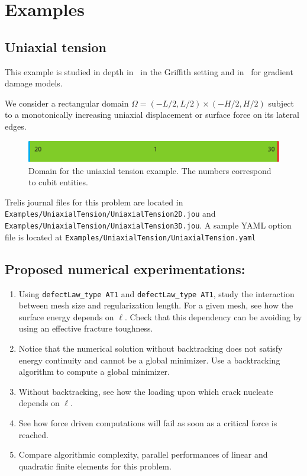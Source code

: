 \documentclass[10pt,oneside]{memoir}
\begin{document}
\chapter{Examples}
\section{Uniaxial tension}
This example is studied in depth in~\cite[Section 3.1]{Bourdin-Francfort-EtAl-2008b} in the Griffith setting and in~\cite{Pham-Amor-EtAl-2011a} for gradient damage models.


We consider a rectangular domain $\Omega = (-L/2,L/2) \times (-H/2,H/2)$ subject to a monotonically increasing uniaxial displacement or surface force on its lateral edges. 


\begin{figure}[H]
\centering
	\includegraphics[width = \textwidth]{Examples/UniaxialTension/Geometry.pdf}
\caption{Domain for the uniaxial tension example. The numbers correspond to cubit entities.}
\label{fig:Uniaxial}
\end{figure}

Trelis journal files for this problem are located in \verb+Examples/UniaxialTension/UniaxialTension2D.jou+ and \verb+Examples/UniaxialTension/UniaxialTension3D.jou+. A sample YAML option file is located at \verb+Examples/UniaxialTension/UniaxialTension.yaml+

\section*{Proposed numerical experimentations:}
\begin{enumerate}
	\item	Using \verb+defectLaw_type AT1+ and \verb+defectLaw_type AT1+, study the interaction between mesh size and regularization length. For a given mesh, see how the surface energy depends on $\ell$. Check that this dependency can be avoiding by using an effective fracture toughness.
	\item Notice that the numerical solution without backtracking does not satisfy energy continuity and cannot be a global minimizer. Use a backtracking algorithm to compute a global minimizer.
	\item Without backtracking, see how the loading upon which crack nucleate depends on $\ell$.
	\item See how force driven computations will fail as soon as a critical force is reached.
	\item Compare algorithmic complexity, parallel performances of linear and quadratic finite elements for this problem.
\end{enumerate}
\end{document}

